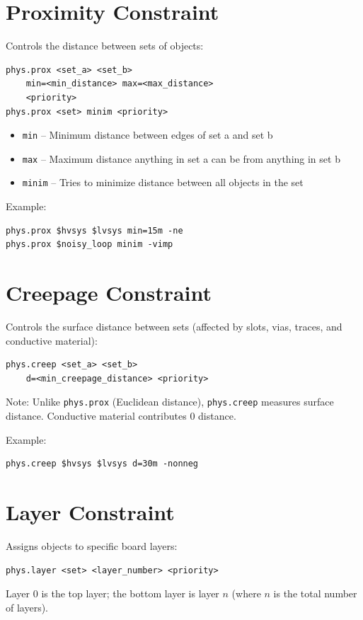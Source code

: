 \section{Proximity Constraint}
Controls the distance between sets of objects:
\begin{verbatim}
phys.prox <set_a> <set_b> 
    min=<min_distance> max=<max_distance> 
    <priority>
phys.prox <set> minim <priority>
\end{verbatim}
\begin{itemize}
\item \texttt{min} -- Minimum distance between edges of set a and set b
\item \texttt{max} -- Maximum distance anything in set a can be from anything in set b
\item \texttt{minim} -- Tries to minimize distance between all objects in the set
\end{itemize}

Example:
\begin{verbatim}
phys.prox $hvsys $lvsys min=15m -ne
phys.prox $noisy_loop minim -vimp
\end{verbatim}

\section{Creepage Constraint}
Controls the surface distance between sets (affected by slots, vias, traces, and conductive material):
\begin{verbatim}
phys.creep <set_a> <set_b> 
    d=<min_creepage_distance> <priority>
\end{verbatim}

Note: Unlike \texttt{phys.prox} (Euclidean distance), \texttt{phys.creep} measures surface distance. Conductive material contributes 0 distance.

Example:
\begin{verbatim}
phys.creep $hvsys $lvsys d=30m -nonneg
\end{verbatim}

\section{Layer Constraint}
Assigns objects to specific board layers:
\begin{verbatim}
phys.layer <set> <layer_number> <priority>
\end{verbatim}
Layer 0 is the top layer; the bottom layer is layer $n$ (where $n$ is the total number of layers).

